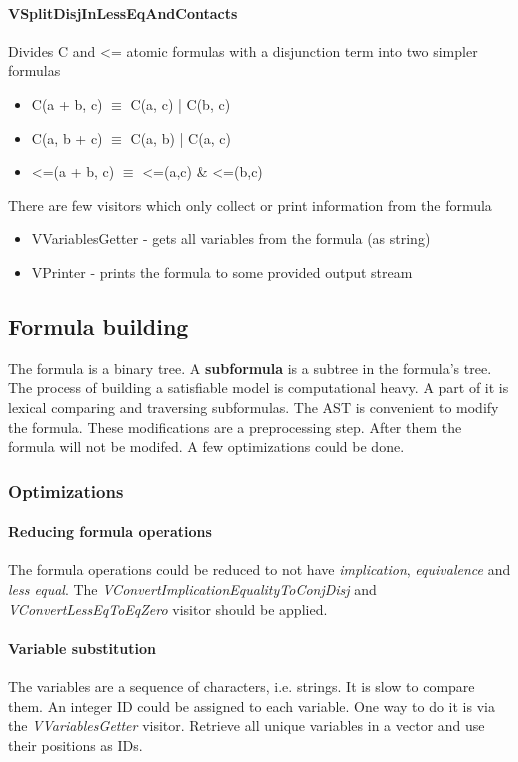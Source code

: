 \documentclass{article}
\begin{document}
	\paragraph{VSplitDisjInLessEqAndContacts}
				Divides C and <= atomic formulas with a disjunction term into two simpler formulas
				\begin{itemize}
					\item C(a + b, c) $\equiv$ C(a, c) | C(b, c)
					\item C(a, b + c) $\equiv$ C(a, b) | C(a, c)
					\item <=(a + b, c) $\equiv$ <=(a,c) \& <=(b,c)
				\end{itemize}

	There are few visitors which only collect or print information from the formula
				\begin{itemize}
					\item VVariablesGetter - gets all variables from the formula (as string)
					\item VPrinter - prints the formula to some provided output stream
				\end{itemize}

	\subsection{Formula building}
	The formula is a binary tree. A \textbf{subformula} is a subtree in the formula's tree. The process of building a satisfiable model is computational heavy. A part of it is lexical comparing and traversing subformulas. The AST is convenient to modify the formula. These modifications are a preprocessing step. After them the formula will not be modifed. A few optimizations could be done.

	\subsubsection{Optimizations}
	\paragraph{Reducing formula operations}
	The formula operations could be reduced to not have \textit{implication}, \textit{equivalence} and \textit{less equal}. The \textit{VConvertImplicationEqualityToConjDisj} and \textit{VConvertLessEqToEqZero} visitor should be applied.

	\paragraph{Variable substitution}
	The variables are a sequence of characters, i.e. strings. It is slow to compare them. An integer ID could be assigned to each variable. One way to do it is via the \textit{VVariablesGetter} visitor. Retrieve all unique variables in a vector and use their positions as IDs.
\end{document}
